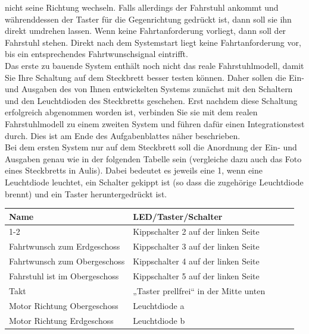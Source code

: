 \documentclass[a4paper,12pt,bibtotocnumbered]{scrartcl} %
\numberwithin{equation}{section} %
\begin{document}
nicht seine Richtung wechseln. Falls allerdings der Fahrstuhl ankommt und währenddessen der
Taster für die Gegenrichtung gedrückt ist, dann soll sie ihn direkt umdrehen lassen. Wenn keine
Fahrtanforderung vorliegt, dann soll der Fahrstuhl stehen. Direkt nach dem Systemstart liegt keine
Fahrtanforderung vor, bis ein entsprechendes Fahrtwunschsignal eintrifft.
\\
Das erste zu bauende System enthält noch nicht das reale Fahrstuhlmodell, damit Sie Ihre
Schaltung auf dem Steckbrett besser testen können. Daher sollen die Ein- und Ausgaben des von
Ihnen entwickelten Systems zunächst mit den Schaltern und den Leuchtdioden des Steckbretts
geschehen. Erst nachdem diese Schaltung erfolgreich abgenommen worden ist, verbinden Sie sie
mit dem realen Fahrstuhlmodell zu einem zweiten System und führen dafür einen Integrationstest
durch. Dies ist am Ende des Aufgabenblattes näher beschrieben.
\\
Bei dem ersten System nur auf dem Steckbrett soll die Anordnung der Ein- und Ausgaben genau
wie in der folgenden Tabelle sein (vergleiche dazu auch das Foto eines Steckbretts in Aulis). Dabei
bedeutet es jeweils eine 1, wenn eine Leuchtdiode leuchtet, ein Schalter gekippt ist (so dass die
zugehörige Leuchtdiode brennt) und ein Taster heruntergedrückt ist.
\begin{table}[H]
	\begin{tabular}{lllll}
		\multicolumn{1}{l|}{Name}                          & LED/Taster/Schalter                   &  &  & \\ \cline{1-2}
		\multicolumn{1}{l|}{Systemstart}                   & Kippschalter 2 auf der linken Seite   &  &  & \\
		\multicolumn{1}{l|}{Fahrtwunsch zum Erdgeschoss}   & Kippschalter 3 auf der linken Seite   &  &  & \\
		\multicolumn{1}{l|}{Fahrtwunsch zum Obergeschoss}  & Kippschalter 4 auf der linken Seite   &  &  & \\
		\multicolumn{1}{l|}{Fahrstuhl ist im Obergeschoss} & Kippschalter 5 auf der linken Seite   &  &  & \\
		\multicolumn{1}{l|}{Takt}                          & „Taster prellfrei“ in der Mitte unten &  &  & \\
		\multicolumn{1}{l|}{Motor Richtung Obergeschoss}   & Leuchtdiode a                         &  &  & \\
		\multicolumn{1}{l|}{Motor Richtung Erdgeschoss}    & Leuchtdiode b                         &  &  & \\
	\end{tabular}
\end{table}
\end{document}
